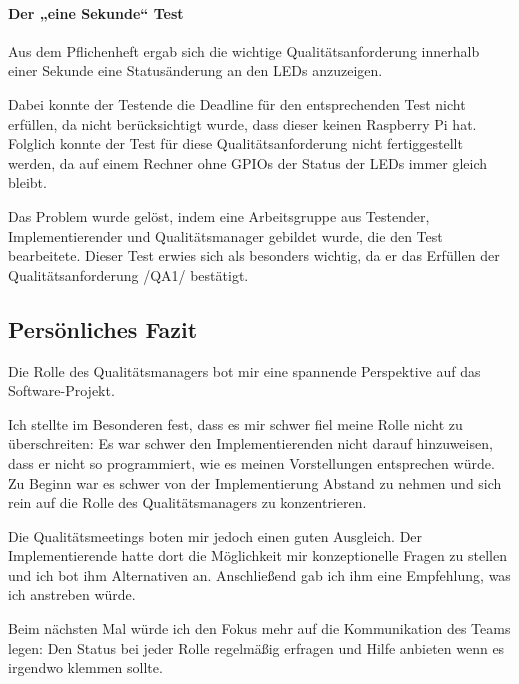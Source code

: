 \paragraph{Der „eine Sekunde“ Test}
Aus dem Pflichenheft ergab sich die wichtige Qualitätsanforderung innerhalb einer Sekunde eine Statusänderung an den LEDs anzuzeigen.

Dabei konnte der Testende die Deadline für den entsprechenden Test nicht erfüllen, da nicht berücksichtigt wurde, dass dieser keinen Raspberry Pi hat. Folglich konnte der Test für diese Qualitätsanforderung nicht fertiggestellt werden, da auf einem Rechner ohne GPIOs der Status der LEDs immer gleich bleibt.

Das Problem wurde gelöst, indem eine Arbeitsgruppe aus Testender, Implementierender und Qualitätsmanager gebildet wurde, die den Test bearbeitete. Dieser Test erwies sich als besonders wichtig, da er das Erfüllen der Qualitätsanforderung /QA1/ bestätigt.
\subsection{Persönliches Fazit}
Die Rolle des Qualitätsmanagers bot mir eine spannende Perspektive auf das Software-Projekt.

Ich stellte im Besonderen fest, dass es mir schwer fiel meine Rolle nicht zu überschreiten: Es war schwer den Implementierenden nicht darauf hinzuweisen, dass er nicht so programmiert, wie es meinen Vorstellungen entsprechen würde. Zu Beginn war es schwer von der Implementierung Abstand zu nehmen und sich rein auf die Rolle des Qualitätsmanagers zu konzentrieren.

Die Qualitätsmeetings boten mir jedoch einen guten Ausgleich. Der Implementierende hatte dort die Möglichkeit mir konzeptionelle Fragen zu stellen und ich bot ihm Alternativen an. Anschließend gab ich ihm eine Empfehlung, was ich anstreben würde.

Beim nächsten Mal würde ich den Fokus mehr auf die Kommunikation des Teams legen: Den Status bei jeder Rolle regelmäßig erfragen und Hilfe anbieten wenn es irgendwo klemmen sollte.